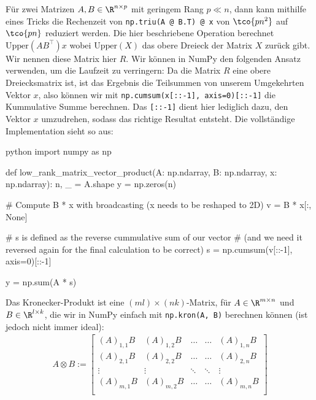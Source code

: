 \inlineex Für zwei Matrizen $A, B \in \R^{n \times p}$ mit geringem Rang $p \ll n$, dann kann mithilfe eines Tricks die Rechenzeit von \verb|np.triu(A @ B.T) @ x| von $\tco{pn^2}$ auf $\tco{pn}$ reduziert werden.
Die hier beschriebene Operation berechnet $\text{Upper}(AB^\top) x$ wobei $\text{Upper}(X)$ das obere Dreieck der Matrix $X$ zurück gibt.
Wir nennen diese Matrix hier $R$.
Wir können in NumPy den folgenden Ansatz verwenden, um die Laufzeit zu verringern:
Da die Matrix $R$ eine obere Dreiecksmatrix ist, ist das Ergebnis die Teilsummen von unserem Umgekehrten Vektor $x$, also können wir mit \verb|np.cumsum(x[::-1], axis=0)[::-1]| die Kummulative Summe berechnen.
Das \verb|[::-1]| dient hier lediglich dazu, den Vektor $x$ umzudrehen, sodass das richtige Resultat entsteht.
Die vollständige Implementation sieht so aus:
\begin{code}{python}
    import numpy as np

    def low_rank_matrix_vector_product(A: np.ndarray, B: np.ndarray, x: np.ndarray):
        n, _ = A.shape
        y = np.zeros(n)

        # Compute B * x with broadcasting (x needs to be reshaped to 2D)
        v = B * x[:, None]

        # s is defined as the reverse cummulative sum of our vector
        # (and we need it reversed again for the final calculation to be correct)
        s = np.cumsum(v[::-1], axis=0)[::-1]

        y = np.sum(A * s)
\end{code}


\setcounter{all}{21}
 Das Kronecker-Produkt ist eine $(ml) \times (nk)$-Matrix, für $A \in \R^{m \times n}$ und $B \in \R^{l \times k}$, die wir in NumPy einfach mit \verb|np.kron(A, B)| berechnen können (ist jedoch nicht immer ideal):
\begin{align*}
    A \otimes B :=
    \begin{bmatrix}
        (A)_{1, 1} B & (A)_{1, 2}B & \ldots & \ldots & (A)_{1, n} B \\
        (A)_{2, 1} B & (A)_{2, 2}B & \ldots & \ldots & (A)_{2, n} B \\
        \vdots       & \vdots      & \ddots & \ddots & \vdots       \\
        (A)_{m, 1} B & (A)_{m, 2}B & \ldots & \ldots & (A)_{m, n} B \\
    \end{bmatrix}
\end{align*}


